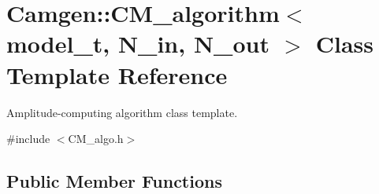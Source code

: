 \hypertarget{a00065}{}\section{Camgen\+:\+:C\+M\+\_\+algorithm$<$ model\+\_\+t, N\+\_\+in, N\+\_\+out $>$ Class Template Reference}
\label{a00065}


Amplitude-\/computing algorithm class template.  




{\ttfamily \#include $<$C\+M\+\_\+algo.\+h$>$}

\subsection*{Public Member Functions}
